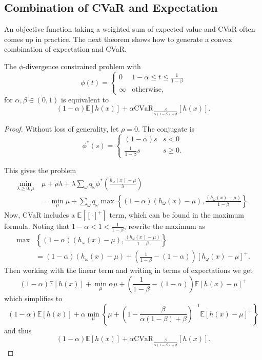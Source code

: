 \documentclass[ijoc,nonblindrev]{informs3} %
\newcommand{\E}{\mathbb{E}}
\newcommand{\e}[1]{\E \left[ #1 \right]}
\begin{document}
\subsection{Combination of CVaR and Expectation}

An objective function taking a weighted sum of expected value and CVaR often comes up in practice.
The next theorem shows how to generate a convex combination of expectation and CVaR.

\begin{theorem}\label{them:expectation_cvar}
	The $\phi$-divergence constrained problem with
	\[
		\phi(t) = 
		\begin{cases}
			0 & 1-\alpha \leq t \leq \frac{1}{1-\beta} \\
			\infty & \text{otherwise},
		\end{cases}
	\]
	for $\alpha,\beta \in (0,1)$ is equivalent to 
	\[
		(1-\alpha)\e{h(x)} + \alpha \mbox{CVaR}_{\frac{\beta}{\alpha(1-\beta)+\beta}}[h(x)].
	\]
\end{theorem}

\begin{proof}
	Without loss of generality, let $\rho = 0$.
	The conjugate is
	\[
		\phi^*(s) = 
		\begin{cases}
			(1-\alpha) s & s < 0 \\
			\frac{1}{1-\beta} s & s \geq 0.
		\end{cases}
	\]
	
	This gives the problem
	\begin{align*}
		\min_{\lambda \geq 0,\mu} & \ \mu + \rho \lambda + \lambda \sum_\omega q_\omega \phi^*\left(\frac{h_\omega(x)-\mu}{\lambda}\right) \\
		& = \min_\mu \mu + \sum_\omega q_\omega \max \left\{ (1-\alpha)(h_\omega(x)-\mu), \frac{(h_\omega(x)-\mu)}{1-\beta} \right\}.
	\end{align*}
	Now, CVaR includes a $\e{[\cdot]^+}$ term, which can be found in the maximum formula.
	Noting that $1-\alpha < 1 < \frac{1}{1-\beta}$, rewrite the maximum as
	\begin{align*}
		\max & \left\{ (1-\alpha)(h_\omega(x)-\mu), \frac{(h_\omega(x)-\mu)}{1-\beta} \right\} \\
		& = (1-\alpha)(h_\omega(x)-\mu) + \left( \frac{1}{1-\beta} - (1-\alpha) \right) \left[ h_\omega(x)-\mu \right]^+.
	\end{align*}
	Then working with the linear term and writing in terms of expectations we get
	\[
		(1-\alpha)\e{h(x)} + \min_\mu \alpha\mu + \left( \frac{1}{1-\beta} - (1-\alpha) \right) \e{h(x)-\mu}^+
	\]
	which simplifies to
	\[
		(1-\alpha)\e{h(x)} + \alpha \min_\mu \left\{ \mu + \left(1 - \frac{\beta}{\alpha(1-\beta)+\beta}\right)^{-1} \e{h(x)-\mu}^+ \right\}
	\]
	and thus
	\[
		(1-\alpha)\e{h(x)} + \alpha \mbox{CVaR}_{\frac{\beta}{\alpha(1-\beta)+\beta}}[h(x)].%
	\]
\end{proof}
\end{document}
